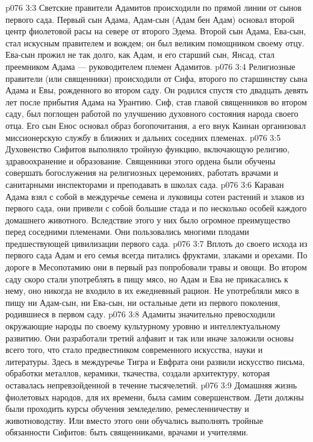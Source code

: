 \vs p076 3:3 \pc Светские правители Адамитов происходили по прямой линии от сынов первого сада. Первый сын Адама, Адам\hyp{}сын (Адам бен Адам) основал второй центр фиолетовой расы на севере от второго Эдема. Второй сын Адама, Ева\hyp{}сын, стал искусным правителем и вождем; он был великим помощником своему отцу. Ева\hyp{}сын прожил не так долго, как Адам, и его старший сын, Янсад, стал преемником Адама --- руководителем племен Адамитов.
\vs p076 3:4 \pc Религиозные правители (или священники) происходили от Сифа, второго по старшинству сына Адама и Евы, рожденного во втором саду. Он родился спустя сто двадцать девять лет после прибытия Адама на Урантию. Сиф, став главой священников во втором саду, был поглощен работой по улучшению духовного состояния народа своего отца. Его сын Енос основал образ богопочитания, а его внук Каинан организовал миссионерскую службу в ближних и дальних соседних племенах.
\vs p076 3:5 Духовенство Сифитов выполняло тройную функцию, включающую религию, здравоохранение и образование. Священники этого ордена были обучены совершать богослужения на религиозных церемониях, работать врачами и санитарными инспекторами и преподавать в школах сада.
\vs p076 3:6 \pc Караван Адама взял с собой в междуречье семена и луковицы сотен растений и злаков из первого сада, они привели с собой большие стада и по несколько особей каждого домашнего животного. Вследствие этого у них было огромное преимущество перед соседними племенами. Они пользовались многими плодами предшествующей цивилизации первого сада.
\vs p076 3:7 Вплоть до своего исхода из первого сада Адам и его семья всегда питались фруктами, злаками и орехами. По дороге в Месопотамию они в первый раз попробовали травы и овощи. Во втором саду скоро стали употреблять в пищу мясо, но Адам и Ева не прикасались к нему, оно никогда не входило в их ежедневный рацион. Не употребляли мясо в пищу ни Адам\hyp{}сын, ни Ева\hyp{}сын, ни остальные дети из первого поколения, родившиеся в первом саду.
\vs p076 3:8 \pc Адамиты значительно превосходили окружающие народы по своему культурному уровню и интеллектуальному развитию. Они разработали третий алфавит и так или иначе заложили основы всего того, что стало предвестником современного искусства, науки и литературы. Здесь в междуречье Тигра и Евфрата они развили искусство письма, обработки металлов, керамики, ткачества, создали архитектуру, которая оставалась непревзойденной в течение тысячелетий.
\vs p076 3:9 Домашняя жизнь фиолетовых народов, для их времени, была самим совершенством. Дети должны были проходить курсы обучения земледелию, ремесленничеству и животноводству. Или вместо этого они обучались выполнять тройные обязанности Сифитов: быть священниками, врачами и учителями.
